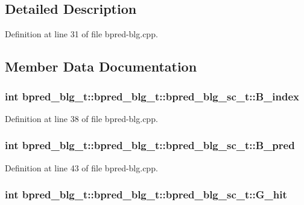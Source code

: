 \subsection{Detailed Description}


Definition at line 31 of file bpred-blg.cpp.

\subsection{Member Data Documentation}
\subsubsection[{B\_\-index}]{\setlength{\rightskip}{0pt plus 5cm}int bpred\_\-blg\_\-t::bpred\_\-blg\_\-t::bpred\_\-blg\_\-sc\_\-t::B\_\-index}\label{classbpred__blg__t_1_1bpred__blg__sc__t_04509708a299a010a84a14bbb484ee07}




Definition at line 38 of file bpred-blg.cpp.
\subsubsection[{B\_\-pred}]{\setlength{\rightskip}{0pt plus 5cm}int bpred\_\-blg\_\-t::bpred\_\-blg\_\-t::bpred\_\-blg\_\-sc\_\-t::B\_\-pred}\label{classbpred__blg__t_1_1bpred__blg__sc__t_c6e46354d0b6a9b8afd23c6f22ca2b1a}




Definition at line 43 of file bpred-blg.cpp.
\subsubsection[{G\_\-hit}]{\setlength{\rightskip}{0pt plus 5cm}int bpred\_\-blg\_\-t::bpred\_\-blg\_\-t::bpred\_\-blg\_\-sc\_\-t::G\_\-hit}\label{classbpred__blg__t_1_1bpred__blg__sc__t_deac8906acab25c8f2aabb4be3cfbc1c}





